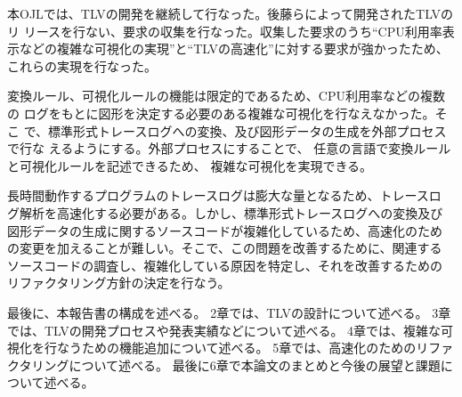 本OJLでは、TLVの開発を継続して行なった。後藤らによって開発されたTLVのリ
リースを行ない、要求の収集を行なった。収集した要求のうち``CPU利用率表
示などの複雑な可視化の実現''と``TLVの高速化''に対する要求が強かったため、
これらの実現を行なった。

変換ルール、可視化ルールの機能は限定的であるため、CPU利用率などの複数の
ログをもとに図形を決定する必要のある複雑な可視化を行なえなかった。そこ
で、標準形式トレースログへの変換、及び図形データの生成を外部プロセスで行な
えるようにする。外部プロセスにすることで、
任意の言語で変換ルールと可視化ルールを記述できるため、
複雑な可視化を実現できる。

長時間動作するプログラムのトレースログは膨大な量となるため、トレースロ
グ解析を高速化する必要がある。しかし、標準形式トレースログへの変換及び
図形データの生成に関するソースコードが複雑化しているため、高速化のため
の変更を加えることが難しい。そこで、この問題を改善するために、関連する
ソースコードの調査し、複雑化している原因を特定し、それを改善するための
リファクタリング方針の決定を行なう。

最後に、本報告書の構成を述べる。
2章では、TLVの設計について述べる。
3章では、TLVの開発プロセスや発表実績などについて述べる。
4章では、複雑な可視化を行なうための機能追加について述べる。
5章では、高速化のためのリファクタリングについて述べる。
最後に6章で本論文のまとめと今後の展望と課題について述べる。

